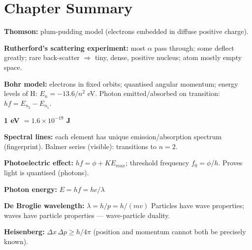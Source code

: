 \section{Chapter Summary}

\begin{summarybox}
\textbf{Thomson:} plum-pudding model (electrons
embedded in diffuse positive charge).

\textbf{Rutherford's scattering experiment:}
most $\alpha$ pass through; some deflect greatly;
rare back-scatter $\Rightarrow$ tiny, dense, positive nucleus;
atom mostly empty space.

\textbf{Bohr model:} electrons in fixed orbits;
quantised angular momentum; energy levels of H:
$E_n = -13.6/n^2$ eV.
Photon emitted/absorbed on transition:
$hf = E_{n_2} - E_{n_1}$.

\textbf{1 eV $= 1.6\times10^{-19}$ J}

\textbf{Spectral lines:} each element has unique
emission/absorption spectrum (fingerprint).
Balmer series (visible): transitions to $n=2$.

\textbf{Photoelectric effect:}
$hf = \phi + KE_{max}$;
threshold frequency $f_0 = \phi/h$.
Proves light is quantised (photons).

\textbf{Photon energy:} $E = hf = hc/\lambda$

\textbf{De Broglie wavelength:} $\lambda = h/p = h/(mv)$
Particles have wave properties; waves have particle
properties --- wave-particle duality.

\textbf{Heisenberg:}
$\Delta x\,\Delta p \geq h/4\pi$
(position and momentum cannot both be precisely known).
\end{summarybox}

